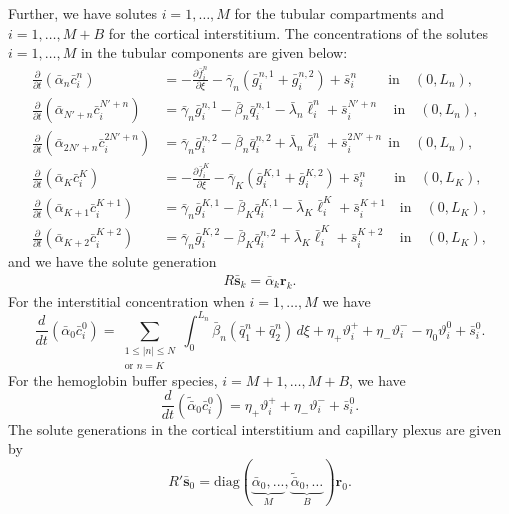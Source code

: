 \documentclass{article}
\begin{document}
Further, we have solutes $i=1,\dots,M$ for the tubular compartments and $i=1,\dots,M+B$ for the cortical interstitium.
The concentrations of the solutes $i=1,\dots,M$ in the tubular components are given below:
\begin{align}
    \frac{\partial }{\partial t}(\bar{\alpha}_n\bar{c}_i^n) &= -\frac{\partial \bar{f}_i^n}{\partial \xi}-\bar{\gamma}_n(\bar{g}_i^{n,1}+\bar{g}_i^{n,2})+\bar{s}_i^{n} \qquad \   \text{in}\quad (0,L_n),\\
    \frac{\partial }{\partial t}(\bar{\alpha}_{N'+n}\bar{c}_i^{N'+n}) &= \bar{\gamma}_{n}\bar{g}_i^{n,1}-\bar{\beta}_n\bar{q}_i^{n,1}-\bar{\lambda}_n\bar{\ell}_i^n+\bar{s}_i^{N'+n} \quad \, \text{in}\quad (0,L_n),\\
    \frac{\partial }{\partial t}(\bar{\alpha}_{2N'+n} \bar{c}_i^{2N'+n}) &= \bar{\gamma}_{n}\bar{g}_i^{n,2}-\bar{\beta}_n\bar{q}_i^{n,2}+\bar{\lambda}_n\bar{\ell}_i^n+\bar{s}_i^{2N'+n}\ \ \text{in}\quad (0,L_n),\\
    \frac{\partial }{\partial t}(\bar{\alpha}_K\bar{c}_i^K) &= -\frac{\partial \bar{f}_i^K}{\partial \xi}-\bar{\gamma}_K(\bar{g}_i^{K,1}+\bar{g}_i^{K,2})+\bar{s}_i^{n} \qquad  \text{in}\quad (0,L_K),\\
    \frac{\partial }{\partial t}(\bar{\alpha}_{K+1}\bar{c}_i^{K+1}) &= \bar{\gamma}_{n}\bar{g}_i^{K,1}-\bar{\beta}_K\bar{q}_i^{K,1}-\bar{\lambda}_K\bar{\ell}_i^K+\bar{s}_i^{K+1} \quad  \text{in}\quad (0,L_K),\\
    \frac{\partial }{\partial t}(\bar{\alpha}_{K+2} \bar{c}_i^{K+2}) &= \bar{\gamma}_{n}\bar{g}_i^{K,2}-\bar{\beta}_K\bar{q}_i^{n,2}+\bar{\lambda}_K\bar{\ell}_i^K+\bar{s}_i^{K+2}\quad \,  \text{in}\quad (0,L_K),
\end{align}
and we have the solute generation
\begin{align}
    R\bar{\mathbf{s}}_k = \bar{\alpha}_k \mathbf{r}_k.
\end{align}
For the interstitial concentration when $i=1,\dots,M$ we have
\begin{equation}
    \frac{d}{d t}(\bar{\alpha}_0 \bar{c}_i^0) =  
        \sum_{\substack{1\leq|n|\leq N\\\text{or } n=K}}\int_0^{L_n}\bar{\beta}_n(\bar{q}_{1}^n+\bar{q}_{2}^n)\,d\xi+\eta_+\vartheta_i^+ + \eta_-\vartheta_i^- -\eta_0\vartheta_i^0+\bar{s}_i^0.
\end{equation}
For the hemoglobin buffer species, $i=M+1,\dots,M+B$, we have
\begin{equation}
    \frac{d}{d t}(\tilde{\bar{\alpha}}_0 \bar{c}_i^0) = 
    \eta_+\vartheta_i^++\eta_-\vartheta_i^-+\bar{s}_i^0.
\end{equation}
The solute generations in the cortical interstitium and capillary plexus are given by
\begin{equation}
    R'\bar{\mathbf{s}}_0 = \mathrm{diag}(\underbrace{\bar{\alpha}_0,...}_{M},\underbrace{\tilde{\bar{\alpha}}_0,\dots}_B)\mathbf{r}_0.
\end{equation}
\end{document}

